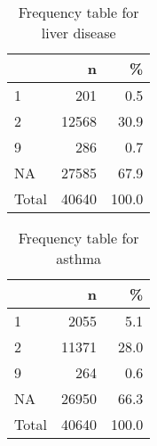 \documentclass[
]{article}
\newenvironment{Shaded}{\begin{snugshade}}{\end{snugshade}}
\newcommand{\DataTypeTok}[1]{\textcolor[rgb]{0.13,0.29,0.53}{#1}}
\newcommand{\DecValTok}[1]{\textcolor[rgb]{0.00,0.00,0.81}{#1}}
\newcommand{\KeywordTok}[1]{\textcolor[rgb]{0.13,0.29,0.53}{\textbf{#1}}}
\newcommand{\NormalTok}[1]{#1}
\newcommand{\OperatorTok}[1]{\textcolor[rgb]{0.81,0.36,0.00}{\textbf{#1}}}
\newcommand{\OtherTok}[1]{\textcolor[rgb]{0.56,0.35,0.01}{#1}}
\newcommand{\StringTok}[1]{\textcolor[rgb]{0.31,0.60,0.02}{#1}}
\begin{document}
\begin{table}[!h]

\caption{\label{tab:unnamed-chunk-31}Frequency table for liver disease}
\centering
\begin{tabular}[t]{l|r|r}
\hline
  & n & \%\\
\hline
1 & 201 & 0.5\\
\hline
2 & 12568 & 30.9\\
\hline
9 & 286 & 0.7\\
\hline
NA & 27585 & 67.9\\
\hline
Total & 40640 & 100.0\\
\hline
\end{tabular}
\end{table}

\begin{Shaded}
\end{Shaded}

\begin{table}[!h]

\caption{\label{tab:unnamed-chunk-32}Frequency table for asthma}
\centering
\begin{tabular}[t]{l|r|r}
\hline
  & n & \%\\
\hline
1 & 2055 & 5.1\\
\hline
2 & 11371 & 28.0\\
\hline
9 & 264 & 0.6\\
\hline
NA & 26950 & 66.3\\
\hline
Total & 40640 & 100.0\\
\hline
\end{tabular}
\end{table}
\end{document}
